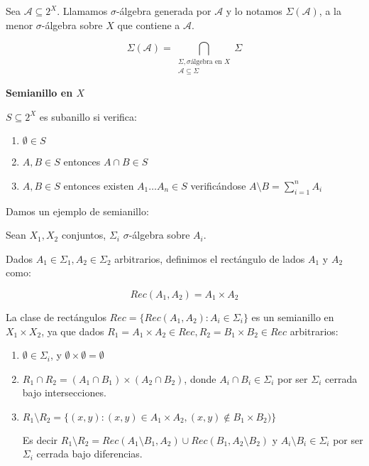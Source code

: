 \begin{definition}
 Sea $\mathcal{A} \subseteq 2^X$. Llamamos $\sigma$-álgebra generada por $\mathcal{A}$ y lo notamos 
 $\Sigma(\mathcal{A})$, a la menor $\sigma$-álgebra sobre $X$ que contiene a $\mathcal{A}$.
 
 \[\Sigma(\mathcal{A}) = 
   \bigcap_{\begin{array}{c}\Sigma, \sigma\textrm{álgebra en } X\\ \mathcal{A}\subseteq \Sigma \end{array}} \Sigma\]
\end{definition}

\begin{definition} \textbf{Semianillo en $X$}

 $S\subseteq 2^X$ es subanillo si verifica:
 
 \begin{enumerate}[i]
  \item $\emptyset \in S$
  \item $A,B \in S$ entonces $A\cap B \in S$
  \item $A,B \in S$ entonces existen $A_1 \ldots A_n \in S$ verificándose $A\setminus B = \sum_{i=1}^n A_i$
 \end{enumerate}
\end{definition}

Damos un ejemplo de semianillo:

\begin{example}
 \label{ex:rectangulos}
 \begin{definition*}
  Sean $X_1, X_2$ conjuntos, $\Sigma_i$ $\sigma$-álgebra sobre $A_i$. 
  
  Dados $A_1 \in \Sigma_1, A_2 \in \Sigma_2$ arbitrarios, definimos el rectángulo de lados $A_1$ y $A_2$ como:
  
  \[Rec(A_1, A_2) = A_1 \times A_2\]
 \end{definition*}
 
 
 La clase de rectángulos $Rec = \{Rec(A_1, A_2): A_i \in \Sigma_i\}$ es un semianillo en $X_1 \times X_2$,
 ya que dados $R_1 = A_1 \times A_2 \in Rec, R_2 = B_1 \times B_2 \in Rec$ arbitrarios:
 
 \begin{enumerate}
  \item $\emptyset \in \Sigma_i$, y $\emptyset \times \emptyset = \emptyset$
  \item $R_1 \cap R_2 = (A_1 \cap B_1) \times (A_2 \cap B_2)$, donde $A_i \cap B_i \in \Sigma_i$ por ser 
  $\Sigma_i$ cerrada bajo intersecciones.
  \item $R_1 \setminus R_2 = \{(x,y): (x,y) \in A_1 \times A_2, (x,y) \notin B_1 \times B_2)\}$
  
  Es decir $R_1 \setminus R_2 = Rec(A_1\setminus B_1, A_2) \cup Rec(B_1, A_2\setminus B_2)$ y 
  $A_i \setminus B_i \in \Sigma_i$ por ser $\Sigma_i$ cerrada bajo diferencias.
 \end{enumerate}

\end{example}


